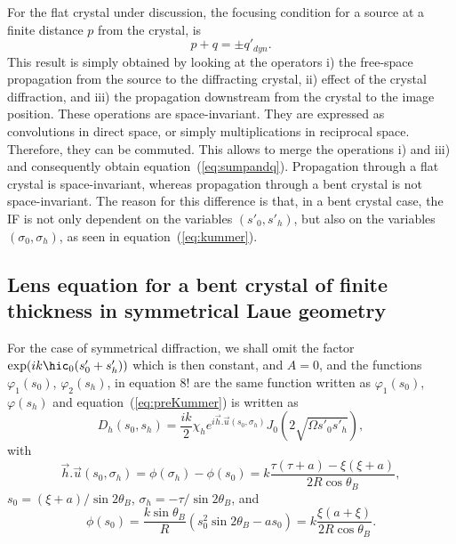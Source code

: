 \documentclass[preprint]{iucr}              %
\newcommand{\inblue}[1]{{\color{black}#1}}
\newcommand{\inred}[1]{{\color{red}#1}}
\begin{document}
For the flat crystal under discussion, the focusing condition for a source at a finite distance $p$ from the crystal, is 
\begin{equation}
    \label{eq:sumpandq}
    p+q=\pm q'_{dyn}.
\end{equation}
\inblue{
This result is simply obtained by looking at the operators i) the free-space propagation from the source to the diffracting crystal, ii) effect of the crystal diffraction, and iii) the propagation downstream from the crystal to the image position. These operations  are space-invariant. They are expressed as convolutions in direct space, or simply multiplications in reciprocal space. Therefore, they can be commuted. This allows to merge the operations i) and iii) and consequently obtain equation~(\ref{eq:sumpandq})}.
Propagation through a flat crystal is space-invariant, whereas propagation through a bent crystal is not space-invariant. The reason for this difference is that, in a bent crystal case, the IF is not only dependent on the variables $(s'_0,s'_h)$, but also on the variables $(\sigma_0,\sigma_h)$, as seen in equation~(\ref{eq:kummer}).



\subsection{Lens equation for a bent crystal of finite thickness in symmetrical Laue geometry}
\label{sec:LaueNewCLE}

For the case of symmetrical diffraction, we shall omit  the factor $\exp(i k \hic_0(s'_0+s'_h))$ which is then constant, and $A=0$, \inred{and the functions $\varphi_1(s_0)$, $\varphi_2(s_h)$, in equation 8! are the same function written as $\varphi_1(s_0)$, $\varphi(s_h)$} and equation~(\ref{eq:preKummer}) is written as
\begin{equation}
\label{eq:DhSymmetricalLaue}
    D_h(s_0,s_h) = \frac{i k}{2} \chi_h e^{i \vec h . \vec u(s_0,\sigma_h)}
    J_0(2\sqrt{\Omega s'_0 s'_h}),
\end{equation}
with 
\begin{equation}
\vec h . \vec u (s_0,\sigma_h) = \phi(\sigma_h)-\phi(s_0) =
k \frac{\tau(\tau+a)-\xi(\xi+a)}{2 R \cos\theta_B}, 
\end{equation}
$s_0=(\xi+  a)/\sin2\theta_B$,
$\sigma_h=-\tau/\sin2\theta_B$, and
\begin{equation}
\phi(s_0)=\frac{k \sin\theta_B}{R}(s_0^2 \sin2\theta_B - a s_0)=k \frac{\xi(a+\xi)}{2R\cos\theta_B}. 
\end{equation}
\end{document}
